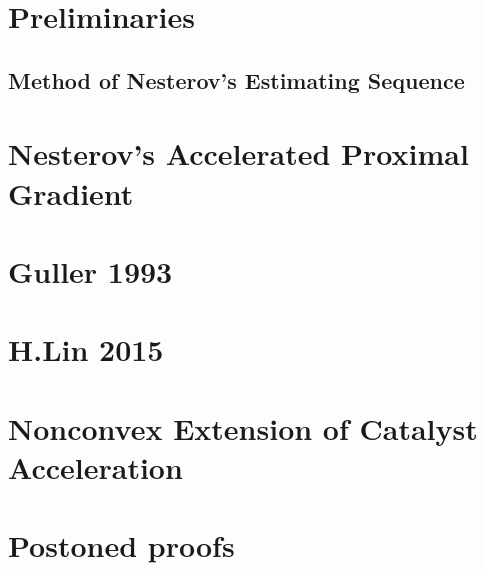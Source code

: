 \documentclass[12pt]{article}
\begin{document}
\section{Preliminaries}\label{sec:preliminaries}
    \subsection{Method of Nesterov's Estimating Sequence}

\section{Nesterov's Accelerated Proximal Gradient}
\section{Guller 1993}
\section{H.Lin 2015}

\section{Nonconvex Extension of Catalyst Acceleration}





\appendix
\section{Postoned proofs}

    
    
\end{document}
